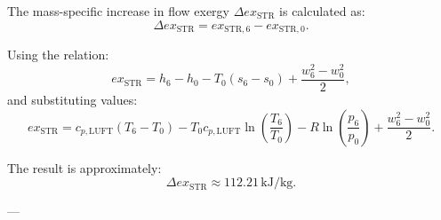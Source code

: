 The mass-specific increase in flow exergy \( \Delta ex_{\text{STR}} \) is calculated as:  
\[
\Delta ex_{\text{STR}} = ex_{\text{STR},6} - ex_{\text{STR},0}.
\]  

Using the relation:  
\[
ex_{\text{STR}} = h_6 - h_0 - T_0 (s_6 - s_0) + \frac{w_6^2 - w_0^2}{2},
\]  
and substituting values:  
\[
ex_{\text{STR}} = c_{p,\text{LUFT}} (T_6 - T_0) - T_0 c_{p,\text{LUFT}} \ln \left( \frac{T_6}{T_0} \right) - R \ln \left( \frac{p_6}{p_0} \right) + \frac{w_6^2 - w_0^2}{2}.
\]  

The result is approximately:  
\[
\Delta ex_{\text{STR}} \approx 112.21 \, \text{kJ/kg}.
\]  

---